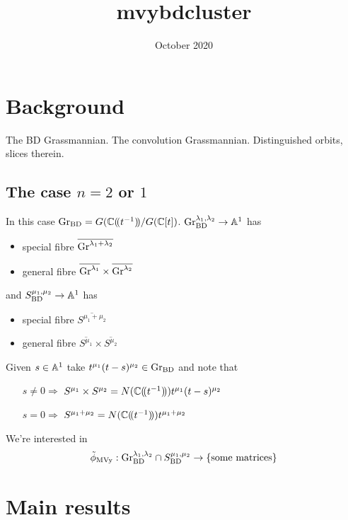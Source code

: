 \documentclass{article}
\title{mvybdcluster}
\date{October 2020}
\begin{document}
\maketitle

\section{Background}

The BD Grassmannian. The convolution Grassmannian. Distinguished orbits, slices therein.

\subsection{The case $n=2$ or $1$}

In this case $\Grbd = G(\CC\xT[t^{-1}]/G(\CC[t])$. 
$\Grbd^{\lambda_1,\lambda_2}\to\AA^1$ has 
\begin{itemize}
    \item special fibre $\overline{\Gr^{\lambda_1 + \lambda_2}}$
    \item general fibre $\overline{\Gr^{\lambda_1}}\times\overline{\Gr^{\lambda_2}}$
\end{itemize}
% 
and $S^{\mu_1,\mu_2}_{\mathrm{BD}}\to\AA^1$ has 
\begin{itemize}
    \item special fibre $\overline{S^{\mu_1+\mu_2}}$
    \item general fibre $\overline{S^{\mu_1}}\times \overline{S^{\mu_2}}$
\end{itemize}

Given $s\in \AA^1$ take $t^{\mu_1}(t-s)^{\mu_2} \in \Grbd$ and note that 
\begin{itemize}
    \item[$s\ne 0\Rightarrow$] $S^{\mu_1}\times S^{\mu_2} = N(\CC\xT[t^{-1}])t^{\mu_1}(t-s)^{\mu_2}$
    \item[$s = 0\Rightarrow$] $S^{\mu_1+\mu_2} = N(\CC\xT[t^{-1}])t^{\mu_1 + \mu_2}$
\end{itemize}


We're interested in
\begin{equation}
\label{eq:topmvy2}
    \tilde\phi_{\mathrm{MVy}}:\Grbd^{\lambda_1,\lambda_2}\cap S^{\mu_1,\mu_2}_{\mathrm{BD}} \to \{\text{some matrices}\}
\end{equation}

\section{Main results}
\end{document}
